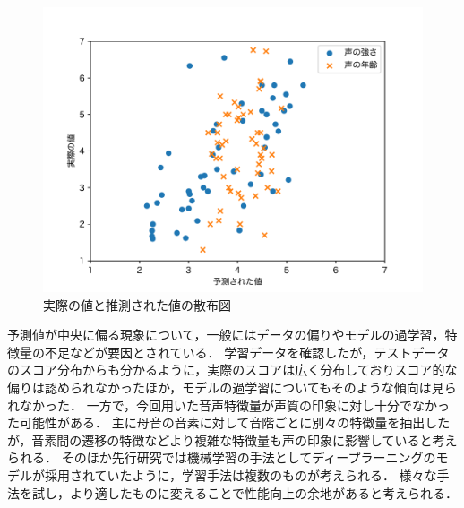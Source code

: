 \begin{figure}[h]
  \centering
  \includegraphics[width=\linewidth]{fig/scatter.pdf}
  \caption{実際の値と推測された値の散布図}
  \label{fig:scatter}
\end{figure}

予測値が中央に偏る現象について，一般にはデータの偏りやモデルの過学習，特徴量の不足などが要因とされている．
学習データを確認したが，テストデータのスコア分布からも分かるように，実際のスコアは広く分布しておりスコア的な偏りは認められなかったほか，モデルの過学習についてもそのような傾向は見られなかった．
一方で，今回用いた音声特徴量が声質の印象に対し十分でなかった可能性がある．
主に母音の音素に対して音階ごとに別々の特徴量を抽出したが，音素間の遷移の特徴などより複雑な特徴量も声の印象に影響していると考えられる．
そのほか先行研究\cite{dnn}では機械学習の手法としてディープラーニングのモデルが採用されていたように，学習手法は複数のものが考えられる．
様々な手法を試し，より適したものに変えることで性能向上の余地があると考えられる．

